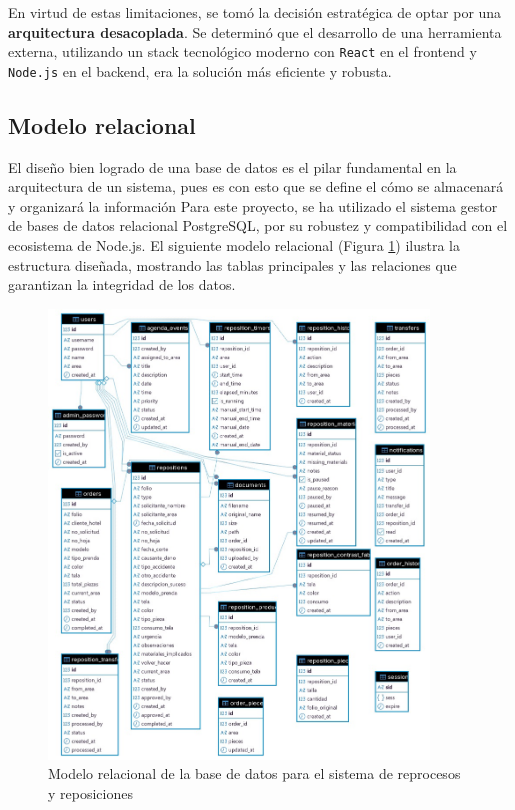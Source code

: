 \documentclass[12pt,letterpaper,spanish]{report}
\begin{document}
En virtud de estas limitaciones, se tomó la decisión estratégica de optar por una \textbf{arquitectura desacoplada}. Se determinó que el desarrollo de una herramienta externa, utilizando un stack tecnológico moderno con \texttt{React} en el frontend y \texttt{Node.js} en el backend, era la solución más eficiente y robusta. 




\subsection{Modelo relacional}
El diseño bien logrado de una base de datos es el pilar fundamental en la arquitectura de un sistema, pues es con esto que se define el cómo se almacenará y organizará la información Para este proyecto, se ha utilizado el sistema gestor de bases de datos relacional PostgreSQL, por su robustez y compatibilidad con el ecosistema de Node.js. El siguiente modelo relacional (Figura \ref{ER}) ilustra la estructura diseñada, mostrando las tablas principales y las relaciones que garantizan la integridad de los datos.
\begin{figure}[H]
  \centering
  \includegraphics[width=0.9\textwidth]{jasanaordenes - public.jpg}
  \caption{Modelo relacional de la base de datos para el sistema de reprocesos y reposiciones}\label{ER}
\end{figure} 
 
\end{document}
